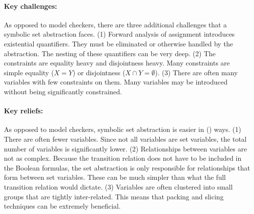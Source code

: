 \paragraph{Key challenges:}  As opposed to model checkers, there are three additional challenges that a symbolic set abstraction faces. (1) Forward analysis of assignment introduces existential quantifiers.  They must be eliminated or otherwise handled by the abstraction.  The nesting of these quantifiers can be very deep. (2) The constraints are equality heavy and disjointness heavy.  Many constraints are simple equality ($X = Y$) or disjointness ($X \cap Y = \emptyset$).  (3) There are often many variables with few constraints on them.  Many variables may be introduced without being significantly constrained.

\paragraph{Key reliefs:}  As opposed to model checkers, symbolic set abstraction is easier in () ways. (1) There are often fewer variables.  Since not all variables are set variables, the total number of variables is significantly lower.  (2) Relationships between variables are not as complex.  Because the transition relation does not have to be included in the Boolean formulas, the set abstraction is only responsible for relationships that form between set variables.  These can be much simpler than what the full transition relation would dictate.  (3) Variables are often clustered into small groups that are tightly inter-related.  This means that packing and slicing techniques can be extremely beneficial.